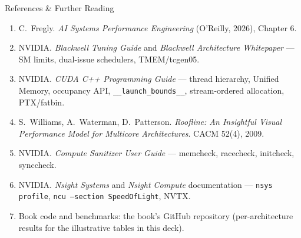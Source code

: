 \documentclass[aspectratio=169]{beamer}
\begin{document}
\begin{frame}{References \& Further Reading}
  \begingroup\footnotesize
  \begin{enumerate}
    \item C.\ Fregly. \emph{AI Systems Performance Engineering} (O'Reilly, 2026), Chapter 6.
    \item NVIDIA. \emph{Blackwell Tuning Guide} and \emph{Blackwell Architecture Whitepaper} ---
          SM limits, dual-issue schedulers, TMEM/tcgen05.
    \item NVIDIA. \emph{CUDA C++ Programming Guide} --- thread hierarchy, Unified Memory,
          occupancy API, \texttt{\_\_launch\_bounds\_\_}, stream-ordered allocation, PTX/fatbin.
    \item S.\ Williams, A.\ Waterman, D.\ Patterson. \emph{Roofline: An Insightful Visual Performance
          Model for Multicore Architectures}. CACM 52(4), 2009.
    \item NVIDIA. \emph{Compute Sanitizer User Guide} --- memcheck, racecheck, initcheck, synccheck.
    \item NVIDIA. \emph{Nsight Systems} and \emph{Nsight Compute} documentation ---
          \texttt{nsys profile}, \texttt{ncu --section SpeedOfLight}, NVTX.
    \item Book code and benchmarks: the book's GitHub repository (per-architecture results for the
          illustrative tables in this deck).
  \end{enumerate}\endgroup
\end{frame}
\end{document}
